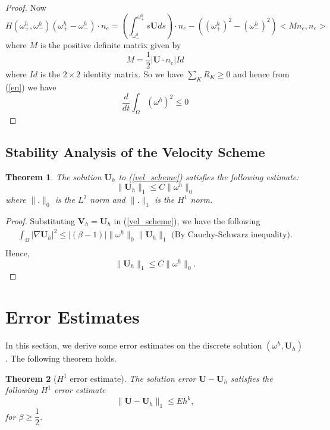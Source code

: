 \documentclass[11pt]{article}
\newtheorem{theorem}{Theorem}[section]
\begin{document}
\begin{proof}
Now 
$$
H(\omega_+^h,\omega_-^h)(\omega^h_+-\omega^h_-)\cdot n_e = \left({\int_{\omega^h_-}^{\omega^h_+}s\textbf{U}ds}\right) \cdot n_e- \left({(\omega^h_+)^2 - (\omega^h_-)^2}\right)<Mn_e, n_e>
$$
where $M$ is the positive definite matrix given by 
$$
M = \frac{1}{2} |\textbf{U}\cdot{n_e}|Id
$$
where $Id$ is the $2\times2$ identity matrix. So we have $\sum_K R_K \geq 0$ and hence from (\ref{en}) we have 
$$
\frac{d}{dt} \int_\Omega (\omega^h)^2 \leq 0
$$
\end{proof}
\subsection{Stability Analysis of the Velocity Scheme}
\begin{theorem} 
 The solution ${\textbf{U}_h}$ to (\ref{vel_scheme}) satisfies the following estimate:
 $$
 \|{\textbf{U}_h}\|_1 \leq C\|\omega^h\|_0
 $$
 where $\|.\|_0$ is the $L^2$ norm and $\|.\|_1$ is the $H^1$ norm.
\end{theorem}
\begin{proof}
Substituting ${\textbf{V}_h}={\textbf{U}_h}$ in (\ref{vel_scheme}), we have the following
\begin{equation*}
\begin{aligned}
\int_\Omega|\nabla\textbf{U}_h|^2\leq|(\beta-1)|\|\omega^h\|_0\|{\textbf{U}_h}\|_1
\mbox{ (By Cauchy-Schwarz inequality)}.\\
\end{aligned}
\end{equation*}
Hence, 
$$
 \|{\textbf{U}_h}\|_1 \leq C\|\omega^h\|_0.
 $$
\end{proof}
\section{Error Estimates}
In this section, we derive some error estimates on the discrete solution $(\omega^h, \textbf{U}_h)$. The following theorem holds.

\begin{theorem}[$H^1$ error estimate]
The solution error $\textbf{U}-\textbf{U}_h$ satisfies the following $H^1$ error estimate 
$$
\|\textbf{U}-\textbf{U}_h\|_1 \leq E h^{k},
$$
for $\beta \geq \dfrac{1}{2}$.
\end{theorem}
\end{document}
